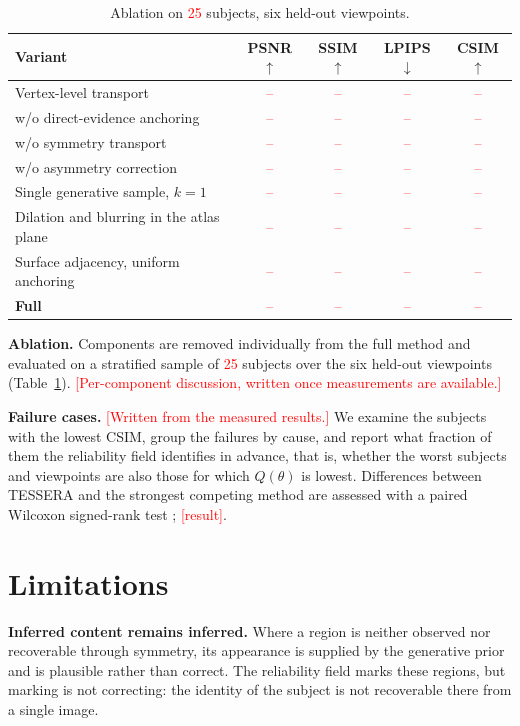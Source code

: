 \documentclass[runningheads]{llncs}
\newcommand{\PH}[1]{\textcolor{red}{#1}}
\begin{document}
\begin{table}[htbp]
  \caption{Ablation on \PH{25} subjects, six held-out viewpoints.}
  \label{tab:ablation}
  \centering
  \begin{tabular}{@{}lcccc@{}}
    \toprule
    Variant & PSNR$\uparrow$ & SSIM$\uparrow$ & LPIPS$\downarrow$ & CSIM$\uparrow$ \\
    \midrule
    Vertex-level transport                & \PH{--} & \PH{--} & \PH{--} & \PH{--} \\
    w/o direct-evidence anchoring         & \PH{--} & \PH{--} & \PH{--} & \PH{--} \\
    w/o symmetry transport                & \PH{--} & \PH{--} & \PH{--} & \PH{--} \\
    w/o asymmetry correction              & \PH{--} & \PH{--} & \PH{--} & \PH{--} \\
    Single generative sample, $k=1$       & \PH{--} & \PH{--} & \PH{--} & \PH{--} \\
    Dilation and blurring in the atlas plane & \PH{--} & \PH{--} & \PH{--} & \PH{--} \\
    Surface adjacency, uniform anchoring  & \PH{--} & \PH{--} & \PH{--} & \PH{--} \\
    \textbf{Full}                         & \PH{--} & \PH{--} & \PH{--} & \PH{--} \\
    \bottomrule
  \end{tabular}
\end{table}

\textbf{Ablation.} Components are removed individually from the full method and
evaluated on a stratified sample of \PH{25} subjects over the six held-out
viewpoints (Table~\ref{tab:ablation}). \PH{[Per-component discussion, written
once measurements are available.]}

\textbf{Failure cases.} \PH{[Written from the measured results.]} We examine
the subjects with the lowest CSIM, group the failures by cause, and report what
fraction of them the reliability field identifies in advance, that is, whether
the worst subjects and viewpoints are also those for which $Q(\theta)$ is
lowest. Differences between TESSERA and the strongest competing method are
assessed with a paired Wilcoxon signed-rank test \cite{wilcoxon1945};
\PH{[result]}.

\section{Limitations}

\textbf{Inferred content remains inferred.} Where a region is neither observed
nor recoverable through symmetry, its appearance is supplied by the generative
prior and is plausible rather than correct. The reliability field marks these
regions, but marking is not correcting: the identity of the subject is not
recoverable there from a single image.
\end{document}
